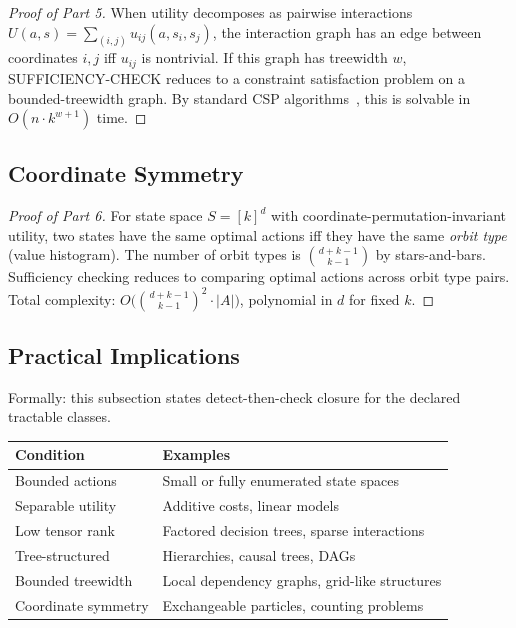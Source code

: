 \begin{proof}[Proof of Part 5]
When utility decomposes as pairwise interactions $U(a,s) = \sum_{(i,j)} u_{ij}(a, s_i, s_j)$, the interaction graph has an edge between coordinates $i,j$ iff $u_{ij}$ is nontrivial. If this graph has treewidth $w$, SUFFICIENCY-CHECK reduces to a constraint satisfaction problem on a bounded-treewidth graph. By standard CSP algorithms~\cite{bodlaender1993tourist, freuder1990complexity}, this is solvable in $O(n \cdot k^{w+1})$ time.
\end{proof}

\subsection{Coordinate Symmetry}

\begin{proof}[Proof of Part 6]
For state space $S = [k]^d$ with coordinate-permutation-invariant utility, two states have the same optimal actions iff they have the same \emph{orbit type} (value histogram). The number of orbit types is $\binom{d+k-1}{k-1}$ by stars-and-bars. Sufficiency checking reduces to comparing optimal actions across orbit type pairs. Total complexity: $O\bigl(\binom{d+k-1}{k-1}^2 \cdot |A|\bigr)$, polynomial in $d$ for fixed $k$.
\end{proof}

\subsection{Practical Implications}

Formally: this subsection states detect-then-check closure for the declared tractable classes.

\begin{center}
\begin{tabular}{ll}
\toprule
\textbf{Condition} & \textbf{Examples} \\
\midrule
Bounded actions & Small or fully enumerated state spaces \\
Separable utility & Additive costs, linear models \\
Low tensor rank & Factored decision trees, sparse interactions \\
Tree-structured & Hierarchies, causal trees, DAGs \\
Bounded treewidth & Local dependency graphs, grid-like structures \\
Coordinate symmetry & Exchangeable particles, counting problems \\
\bottomrule
\end{tabular}
\end{center}

